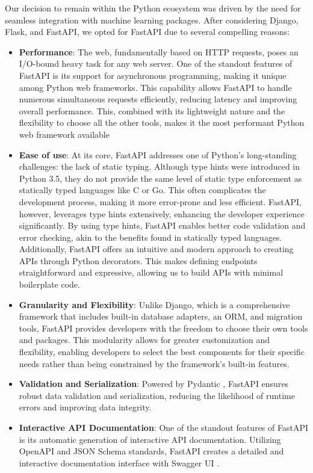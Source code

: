 Our decision to remain within the Python ecosystem was driven by the need for seamless integration with machine learning packages. After considering Django, Flask, and FastAPI, we opted for FastAPI due to several compelling reasons:

\begin{itemize}
    \item \textbf{Performance}: The web, fundamentally based on HTTP requests, poses an I/O-bound heavy task for any web server. One of the standout features of FastAPI is its support for asynchronous programming, making it unique among Python web frameworks. This capability allows FastAPI to handle numerous simultaneous requests efficiently, reducing latency and improving overall performance. This, combined with its lightweight nature and the flexibility to choose all the other tools, makes it the most performant Python web framework available
    \item \textbf{Ease of use}: At its core, FastAPI addresses one of Python's long-standing challenges: the lack of static typing. Although type hints were introduced in Python 3.5, they do not provide the same level of static type enforcement as statically typed languages like C or Go. This often complicates the development process, making it more error-prone and less efficient. FastAPI, however, leverages type hints extensively, enhancing the developer experience significantly. By using type hints, FastAPI enables better code validation and error checking, akin to the benefits found in statically typed languages. Additionally, FastAPI offers an intuitive and modern approach to creating APIs through Python decorators. This makes defining endpoints straightforward and expressive, allowing us to build APIs with minimal boilerplate code.
    \item \textbf{Granularity and Flexibility}: Unlike Django, which is a comprehensive framework that includes built-in database adapters, an ORM, and migration tools, FastAPI provides developers with the freedom to choose their own tools and packages. This modularity allows for greater customization and flexibility, enabling developers to select the best components for their specific needs rather than being constrained by the framework’s built-in features.
    \item \textbf{Validation and Serialization}: Powered by Pydantic \cite{pydantic}, FastAPI ensures robust data validation and serialization, reducing the likelihood of runtime errors and improving data integrity.
    \item \textbf{Interactive API Documentation}: One of the standout features of FastAPI is its automatic generation of interactive API documentation. Utilizing OpenAPI \cite{openapi} and JSON Schema standards, FastAPI creates a detailed and interactive documentation interface with Swagger UI \cite{swagger}.
\end{itemize}

